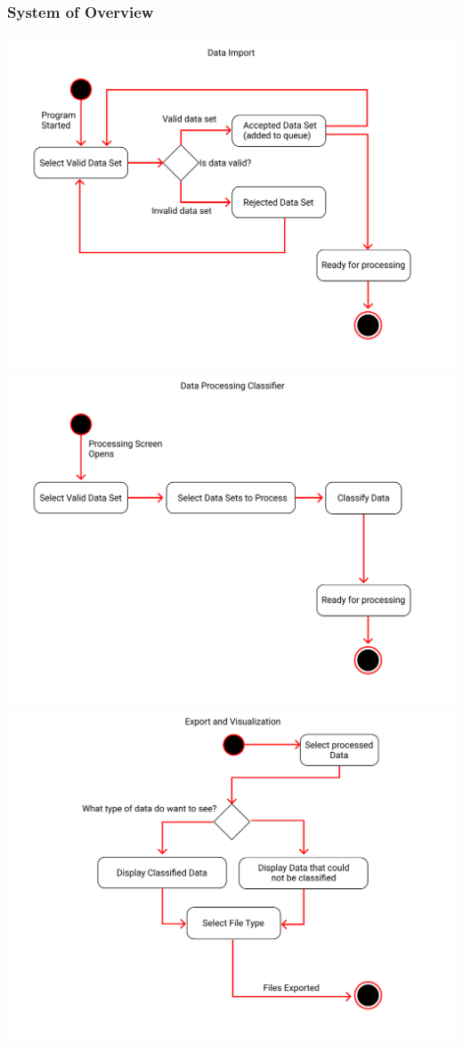 \documentclass[12pt,oneside,letterpaper]{article}
\begin{document}
\subsubsection{System of Overview}
\includegraphics[scale = 0.50]{LandonOverview1.png}
\includegraphics[scale = 0.50]{LandonOverview2.png}
\includegraphics[scale = 0.50]{LandonOverview3.png}
\begingroup
{}
\endgroup
\end{document}
